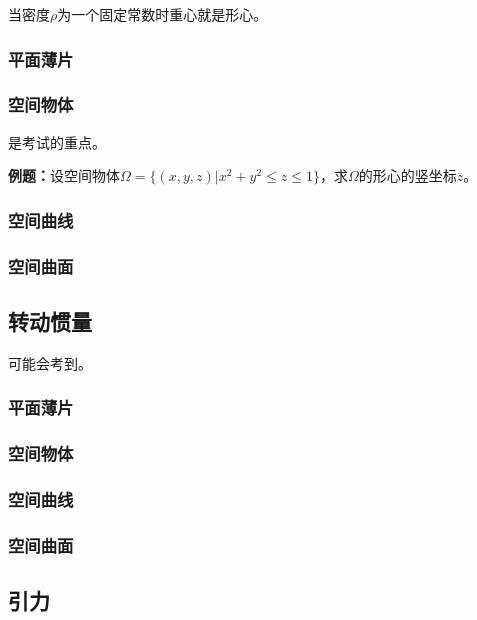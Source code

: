 \documentclass[UTF8, 12pt]{ctexart}
\begin{document}
当密度$\rho$为一个固定常数时重心就是形心。

\subsubsection{平面薄片}

\subsubsection{空间物体}

是考试的重点。

\textbf{例题：}设空间物体$\Omega=\{(x,y,z)|x^2+y^2\leqslant z\leqslant1\}$，求$\Omega$的形心的竖坐标$\overline{z}$。


\subsubsection{空间曲线}

\subsubsection{空间曲面}

\subsection{转动惯量}

可能会考到。

\subsubsection{平面薄片}

\subsubsection{空间物体}

\subsubsection{空间曲线}

\subsubsection{空间曲面}

\subsection{引力}
\end{document}
